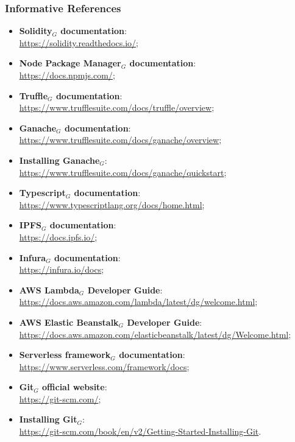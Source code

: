 		\subsubsection{Informative References}
			\begin{itemize}
				\item \textbf{Solidity$_{G}$ documentation}: \\
				\url{https://solidity.readthedocs.io/};
				
				\item \textbf{Node Package Manager$_{G}$ documentation}: \\
				\url{https://docs.npmjs.com/};
				
				\item \textbf{Truffle$_{G}$ documentation}: \\
				\url{https://www.trufflesuite.com/docs/truffle/overview};
				
				\item \textbf{Ganache$_{G}$ documentation}: \\
				\url{https://www.trufflesuite.com/docs/ganache/overview};
				
				\item \textbf{Installing Ganache$_{G}$}: \\
				\url{https://www.trufflesuite.com/docs/ganache/quickstart};
				
				\item \textbf{Typescript$_{G}$ documentation}: \\
				\url{https://www.typescriptlang.org/docs/home.html};
				
				\item \textbf{IPFS$_{G}$ documentation}: \\
				\url{https://docs.ipfs.io/};
				
				\item \textbf{Infura$_{G}$ documentation}: \\
				\url{https://infura.io/docs};
				
				\item \textbf{AWS Lambda$_{G}$ Developer Guide}: \\
				\url{https://docs.aws.amazon.com/lambda/latest/dg/welcome.html};
				
				\item \textbf{AWS Elastic Beanstalk$_{G}$ Developer Guide}: \\
				\url{https://docs.aws.amazon.com/elasticbeanstalk/latest/dg/Welcome.html};
				
				\item \textbf{Serverless framework$_{G}$ documentation}: \\
				\url{https://www.serverless.com/framework/docs};
				
				\item \textbf{Git$_{G}$ official website}: \\
				\url{https://git-scm.com/};
				
				\item \textbf{Installing Git$_{G}$}: \\
				\url{https://git-scm.com/book/en/v2/Getting-Started-Installing-Git}.
			\end{itemize}
